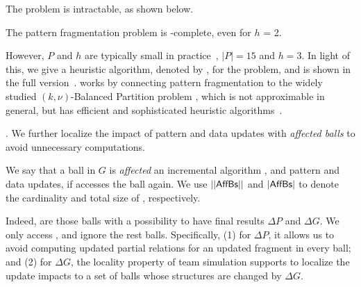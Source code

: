 The problem is intractable, as shown below.

\vspace{-0.5ex}
\begin{prop}
	\label{prop-fragmentation}
	The pattern fragmentation problem is \NP-complete, even for $h$ = 2.
\end{prop}



However, $P$ and $h$ are typically small in practice~\cite{FanLMTWW10}, \eg $|P|=15$ and $h=3$.
In light of this, we give a heuristic algorithm, denoted by , for the problem, and is shown in the
full version~\cite{fullvldb18}.
 works by connecting pattern fragmentation to the widely studied {\sc $(k, \nu)$-Balanced Partition} problem \cite{AndreevR06},
which is not approximable in general, but has efficient and sophisticated heuristic algorithms~\cite{metis-KarypisK98a}.




.
We further localize the impact of pattern and data updates  with {\em affected balls} to avoid unnecessary computations.


We say that a ball in $G$ is {\em affected} \wrt an incremental algorithm , and pattern and data updates,
if  accesses the ball again.
We use $||{\mathsf{AffBs}}||$ and $|{\mathsf{AffBs}}|$ to denote the cardinality and total size of \affballsx, respectively.


%
Indeed, \affballsx are those balls with a possibility to have final results \wrt $\Delta P$ and $\Delta G$.
We only access \affballsx, and ignore the rest balls.
Specifically, (1) for $\Delta P$, it allows us to avoid computing updated partial relations for an updated fragment in every ball;
and (2) for $\Delta G$, the locality property of team simulation supports to localize the update impacts to a set of balls whose structures are changed by $\Delta G$.




